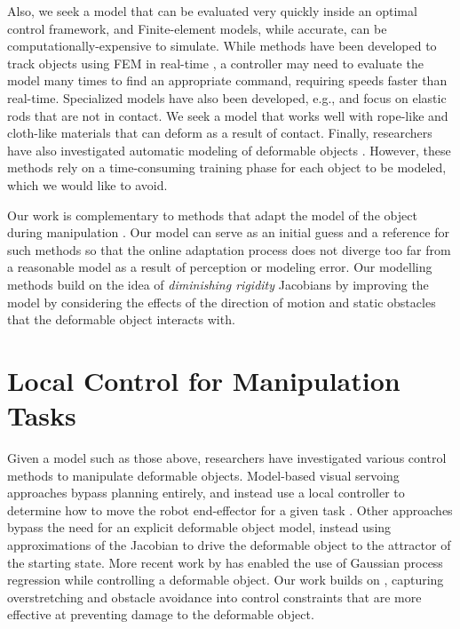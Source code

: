 Also, we seek a model that can be evaluated very quickly inside an optimal control framework, and Finite-element models, while accurate, can be computationally-expensive to simulate. While methods have been developed to track objects using FEM in real-time \cite{Petit2017}, a controller may need to evaluate the model many times to find an appropriate command, requiring speeds faster than real-time. Specialized models have also been developed, e.g., \cite{Borum2014} and \cite{Bretl2014} focus on elastic rods that are not in contact. We seek a model that works well with rope-like and cloth-like materials that can deform as a result of contact. Finally, researchers have also investigated automatic modeling of deformable objects \cite{Lang2002, Cretu2008}. However, these methods rely on a time-consuming training phase for each object to be modeled, which we would like to avoid.

Our work is complementary to methods that adapt the model of the object during manipulation \cite{Navarro-Alarcon2014, NavarroAlarcon2018, Hu2018deformable_gpr}. Our model can serve as an initial guess and a reference for such methods so that the online adaptation process does not diverge too far from a reasonable model as a result of perception or modeling error. Our modelling methods build on the idea of \textit{diminishing rigidity} Jacobians \cite{Berenson2013} by improving the model by considering the effects of the direction of motion and static obstacles that the deformable object interacts with.


\section{Local Control for Manipulation Tasks}

Given a model such as those above, researchers have investigated various control methods to manipulate deformable objects. Model-based visual servoing approaches bypass planning entirely, and instead use a local controller to determine how to move the robot end-effector for a given task \cite{Hirai2000, Wada2001, Smolen2009}. Other approaches \cite{Berenson2013, Navarro-Alarcon2014, NavarroAlarcon2016, NavarroAlarcon2018} bypass the need for an explicit deformable object model, instead using approximations of the Jacobian to drive the deformable object to the attractor of the starting state. More recent work by \citet{Hu2018deformable_gpr} has enabled the use of Gaussian process regression while controlling a deformable object. Our work builds on \citet{Berenson2013}, capturing overstretching and obstacle avoidance into control constraints that are more effective at preventing damage to the deformable object.

